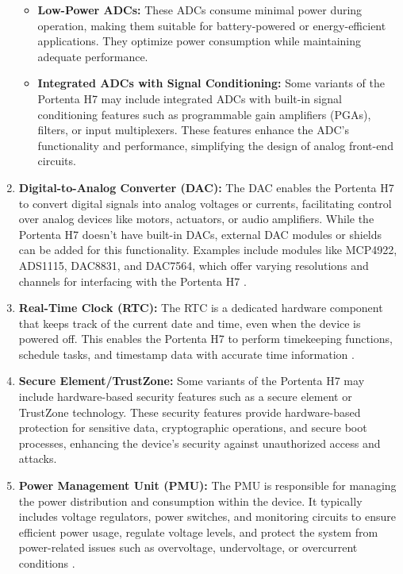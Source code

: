 \begin{enumerate}
\begin{itemize}
		\item \textbf{Low-Power ADCs:} These ADCs consume minimal power during operation, making them suitable for battery-powered or energy-efficient applications. They optimize power consumption while maintaining adequate performance.
		
		\item \textbf{Integrated ADCs with Signal Conditioning:} Some variants of the Portenta H7 may include integrated ADCs with built-in signal conditioning features such as programmable gain amplifiers (PGAs), filters, or input multiplexers. These features enhance the ADC's functionality and performance, simplifying the design of analog front-end circuits.	
		
	\end{itemize}
	
	
	
	\item \textbf{Digital-to-Analog Converter (DAC):} The DAC enables the Portenta H7 to convert digital signals into analog voltages or currents, facilitating control over analog devices like motors, actuators, or audio amplifiers. While the Portenta H7 doesn't have built-in DACs, external DAC modules or shields can be added for this functionality. Examples include modules like MCP4922, ADS1115, DAC8831, and DAC7564, which offer varying resolutions and channels for interfacing with the Portenta H7 \cite{arduinoABX00042:2024}.
	
	\item \textbf{Real-Time Clock (RTC):} The RTC is a dedicated hardware component that keeps track of the current date and time, even when the device is powered off. This enables the Portenta H7 to perform timekeeping functions, schedule tasks, and timestamp data with accurate time information \cite{arduinoABX00042:2024}.
	
	\item \textbf{Secure Element/TrustZone:} Some variants of the Portenta H7 may include hardware-based security features such as a secure element or TrustZone technology. These security features provide hardware-based protection for sensitive data, cryptographic operations, and secure boot processes, enhancing the device's security against unauthorized access and attacks.
	
	\item \textbf{Power Management Unit (PMU):} The PMU is responsible for managing the power distribution and consumption within the device. It typically includes voltage regulators, power switches, and monitoring circuits to ensure efficient power usage, regulate voltage levels, and protect the system from power-related issues such as overvoltage, undervoltage, or overcurrent conditions \cite{arduinoABX00042:2024}.
	

\end{enumerate}
